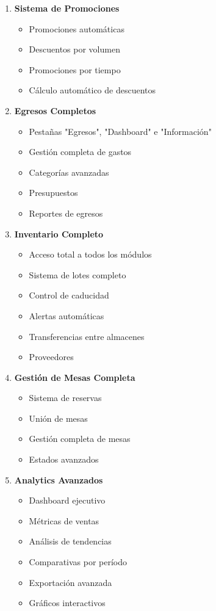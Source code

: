 \documentclass[12pt,a4paper]{article}
\begin{document}
\begin{enumerate}
    \item \textbf{Sistema de Promociones}
    \begin{itemize}
        \item Promociones automáticas
        \item Descuentos por volumen
        \item Promociones por tiempo
        \item Cálculo automático de descuentos
    \end{itemize}
    
    \item \textbf{Egresos Completos}
    \begin{itemize}
        \item Pestañas "Egresos", "Dashboard" e "Información"
        \item Gestión completa de gastos
        \item Categorías avanzadas
        \item Presupuestos
        \item Reportes de egresos
    \end{itemize}
    
    \item \textbf{Inventario Completo}
    \begin{itemize}
        \item Acceso total a todos los módulos
        \item Sistema de lotes completo
        \item Control de caducidad
        \item Alertas automáticas
        \item Transferencias entre almacenes
        \item Proveedores
    \end{itemize}
    
    \item \textbf{Gestión de Mesas Completa}
    \begin{itemize}
        \item Sistema de reservas
        \item Unión de mesas
        \item Gestión completa de mesas
        \item Estados avanzados
    \end{itemize}
    
    \item \textbf{Analytics Avanzados}
    \begin{itemize}
        \item Dashboard ejecutivo
        \item Métricas de ventas
        \item Análisis de tendencias
        \item Comparativas por período
        \item Exportación avanzada
        \item Gráficos interactivos
    \end{itemize}
    

\end{enumerate}
\end{document}
